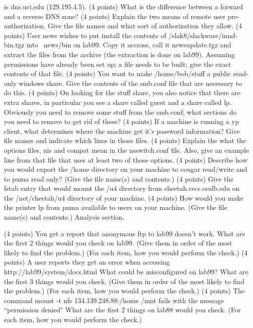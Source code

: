 is {\ltt{}dns.uci.edu} ({\ltt{}129.195.4.5}).
\vfill
\ques
(4 points)
What is the difference between a forward and a reverse DNS zone?
\vskip 1.2in
\eject
\ques
(4 points)
Explain the two means of remote user pre-authorization.
Give the file names and what sort of authorization they allow.
\vskip 1.5in
\ques
(4 points)
User {\ltt{}news} wishes to put install the contents
of {\ltt{}/slak8/slackware/innd-bin.tgz}
into {\ltt{}~news/bin} on {\ltt{}lab99}. Copy
it accross, call it {\ltt{}newsupdate.tgz} and extract the files from
the archive (the extraction is done on {\ltt{}lab99}).
Assuming permissions have already been set up;
a file needs to be built; give the exact contents of that file.
\vskip 2.1in
\ques
(4 points)
You want to make {\ltt{}/home/bob/stuff} a public read-only windows
share.
Give the contents of the {\ltt{}smb.conf} file that are necessary
to do this.
\vskip 1.8in
\vfill
\ques
(4 points)
On looking for the stuff share, you also notice that there are
extra shares, in particular you see a share called {\ltt{}guest}
and a share called {\ltt{}lp}.
Obviously you need to remove some stuff from the {\ltt{}smb.conf};
what sections do you need to remove to get rid of these?
\vskip 1.0in
\eject
\ques
(4 points)
If a machine is running a yp client, what determines where
the machine get it's password information? Give file names
and indicate which lines in those files.
\vskip 1.5in
\ques
(4 points)
Explain the what the options {\ltt{}files}, {\ltt{}nis} and
{\ltt{}compat} mean in the {\ltt{}nsswitch.conf} file.
Also, give an example line from that file that uses at
least two of those options.
\vskip 1.9in
\ques
(4 points)
Describe how you would
export the {\ltt{}/home} directory on your machine to
{\ltt{}cougar} read/write
and to {\ltt{}puma} read only?
(Give the file name(s) and contents.)
\vskip 1.7in
\ques
(4 points)
Give the {\ltt{}fstab} entry that would mount
the {\ltt{}/u4} directory from {\ltt{}cheetah.cecs.csulb.edu}
on the {\ltt{}/net/cheetah/u4} directory of your machine.
\vskip 0.8in
\ques
(4 points)
How would you make the printer {\ltt{}lp} from
{\ltt{}puma} available to users on your machine.
(Give the file name(s) and contents.)
\vskip 1.0in
\vfill\eject
Analysis section. 

\ques
(4 points)
You get a report that anonymous {\ltt{}ftp} to
{\ltt{}lab99} doesn't work.
What are the first 2 things would you check on {\ltt{}lab99}.
(Give them in order of the most likely to find the problem.)
(For each item, how you would perform the check.)
\vfill
\ques
(4 points)
A user reports they get an error
when accessing {\ltt{}http://lab99/system/docs.html}
What could be misconfigured on {\ltt{}lab99}?
What are the first 3 things would you check.
(Give them in order of the most likely to find the problem.)
(For each item, how you would perform the check.)
\vfill
\ques
(4 points)
The command {\ltt{}mount -t nfs 134.139.248.88:/home /mnt} fails with the
message ``permission denied"
What are the first 2 things on {\ltt{}lab88} would you check.
(For each item, how you would perform the check.)
\bye
